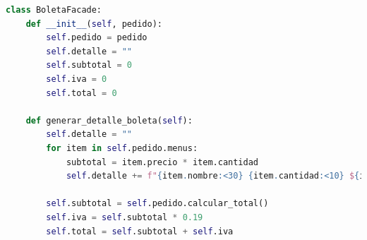 \documentclass[12pt,letterpaper]{article}
\begin{document}
\begin{lstlisting}[language=Python, caption=Implementación de BoletaFacade]
class BoletaFacade:
    def __init__(self, pedido):
        self.pedido = pedido
        self.detalle = ""
        self.subtotal = 0
        self.iva = 0
        self.total = 0

    def generar_detalle_boleta(self):
        self.detalle = ""
        for item in self.pedido.menus:
            subtotal = item.precio * item.cantidad
            self.detalle += f"{item.nombre:<30} {item.cantidad:<10} ${item.precio:<10.2f} ${subtotal:<10.2f}\n"
        
        self.subtotal = self.pedido.calcular_total()
        self.iva = self.subtotal * 0.19
        self.total = self.subtotal + self.iva
\end{lstlisting}
\end{document}
